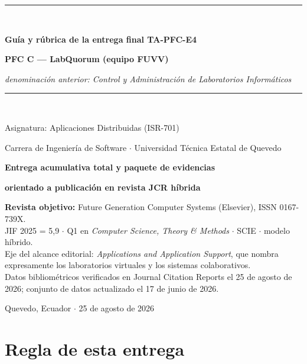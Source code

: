 \documentclass[11pt,a4paper]{article}
\begin{document}
\begin{titlepage}
	\centering
	\vspace*{1.2cm}
	{\color{azulUTEQ}\rule{\textwidth}{2pt}}\\[10pt]
	{\LARGE\bfseries\color{azulUTEQ} Guía y rúbrica de la entrega final TA-PFC-E4\par}
	\vspace{8pt}
	{\Large\bfseries\color{azulUTEQ} PFC C --- LabQuorum (equipo FUVV)\par}
	\vspace{4pt}
	{\normalsize\color{grisTexto}\emph{denominación anterior: Control y Administración de Laboratorios Informáticos}\par}
	\vspace{10pt}
	{\color{azulUTEQ}\rule{\textwidth}{2pt}}\\[16pt]
	{\large Asignatura: Aplicaciones Distribuidas (ISR-701)\par}
	\vspace{4pt}
	{\large Carrera de Ingeniería de Software $\cdot$ Universidad Técnica Estatal de Quevedo\par}
	\vspace{24pt}
	{\large\bfseries Entrega acumulativa total y paquete de evidencias\par}
	{\large\bfseries orientado a publicación en revista JCR híbrida\par}
	\vspace{24pt}
	\begin{minipage}{0.86\textwidth}
		\centering
		\color{grisTexto}
		\small
		\textbf{Revista objetivo:} Future Generation Computer Systems (Elsevier), ISSN 0167-739X.\\
		JIF 2025 = 5,9 $\cdot$ Q1 en \emph{Computer Science, Theory \& Methods} $\cdot$ SCIE $\cdot$ modelo híbrido.\\[6pt]
		Eje del alcance editorial: \emph{Applications and Application Support}, que nombra expresamente los laboratorios virtuales y los sistemas colaborativos.\\[6pt]
		Datos bibliométricos verificados en Journal Citation Reports el 25 de agosto de 2026; conjunto de datos actualizado el 17 de junio de 2026.
	\end{minipage}
	\vfill
	{\small Quevedo, Ecuador $\cdot$ 25 de agosto de 2026\par}
\end{titlepage}

\tableofcontents
\newpage

\section{Regla de esta entrega}
\end{document}
